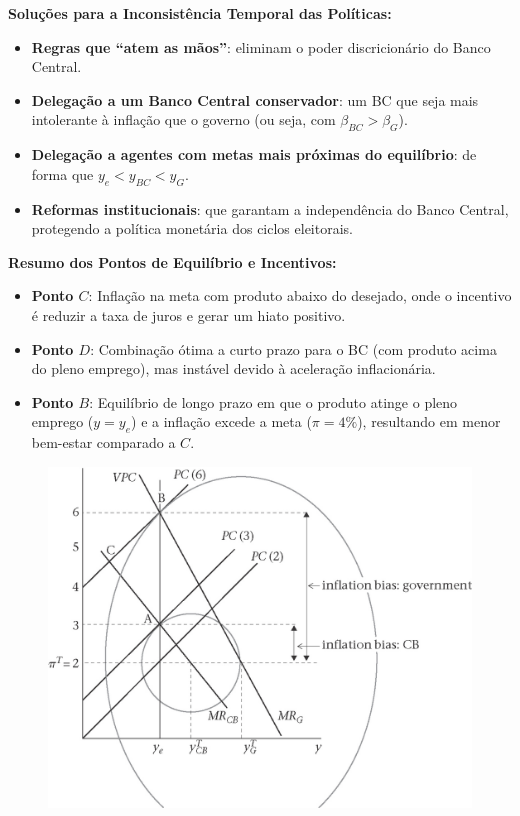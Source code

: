 \documentclass[a4paper,12pt]{article}[abntex2]
\begin{document}
\textbf{Soluções para a Inconsistência Temporal das Políticas:}
\begin{itemize}
    \item \textbf{Regras que “atem as mãos”}: eliminam o poder discricionário do Banco Central.
    \item \textbf{Delegação a um Banco Central conservador}: um BC que seja mais intolerante à inflação que o governo (ou seja, com $\beta_{BC} > \beta_G$).
    \item \textbf{Delegação a agentes com metas mais próximas do equilíbrio}: de forma que $y_e < y_{BC} < y_G$.
    \item \textbf{Reformas institucionais}: que garantam a independência do Banco Central, protegendo a política monetária dos ciclos eleitorais.
\end{itemize}

\textbf{Resumo dos Pontos de Equilíbrio e Incentivos:}
\begin{itemize}
    \item \textbf{Ponto $C$}: Inflação na meta com produto abaixo do desejado, onde o incentivo é reduzir a taxa de juros e gerar um hiato positivo.
    \item \textbf{Ponto $D$}: Combinação ótima a curto prazo para o BC (com produto acima do pleno emprego), mas instável devido à aceleração inflacionária.
    \item \textbf{Ponto $B$}: Equilíbrio de longo prazo em que o produto atinge o pleno emprego ($y = y_e$) e a inflação excede a meta ($\pi = 4\%$), resultando em menor bem-estar comparado a $C$.
\end{itemize}

\begin{figure}[H]
    \centering
    \includegraphics[width=0.7\linewidth]{Imagens/a17i3.png}
\end{figure}
\end{document}
